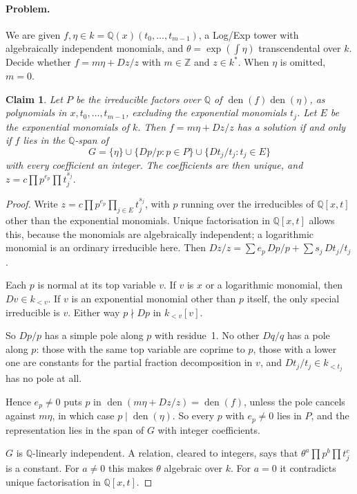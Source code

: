 \documentclass[11pt]{article}
\newtheorem{claim}[theorem]{Claim}
\theoremstyle{definition}
\theoremstyle{remark}
\newcommand{\Q}{\mathbb{Q}}
\newcommand{\Z}{\mathbb{Z}}
\begin{document}
\paragraph{Problem.} We are given $f,\eta\in k=\Q(x)(t_0,\dots,t_{m-1})$, a
Log/Exp tower with algebraically independent monomials, and
$\theta=\exp(\int\eta)$ transcendental over $k$. Decide whether
$f=m\eta+Dz/z$ with $m\in\Z$ and $z\in k^*$. When $\eta$ is omitted, $m=0$.

\begin{claim}
Let $P$ be the irreducible factors over $\Q$ of $\operatorname{den}(f)\operatorname{den}(\eta)$,
as polynomials in $x,t_0,\dots,t_{m-1}$, excluding the exponential monomials
$t_j$. Let $E$ be the exponential monomials of $k$. Then $f=m\eta+Dz/z$ has a
solution if and only if $f$ lies in the $\Q$-span of
\[ G=\{\eta\}\cup\{Dp/p : p\in P\}\cup\{Dt_j/t_j : t_j\in E\} \]
with every coefficient an integer. The coefficients are then unique, and
$z=c\prod p^{e_p}\prod t_j^{s_j}$.
\end{claim}

\begin{proof}
Write $z=c\prod p^{e_p}\prod_{j\in E}t_j^{s_j}$, with $p$ running over the
irreducibles of $\Q[x,t]$ other than the exponential monomials. Unique
factorisation in $\Q[x,t]$ allows this, because the monomials are algebraically
independent; a logarithmic monomial is an ordinary irreducible here. Then
$Dz/z=\sum e_p\,Dp/p+\sum s_j\,Dt_j/t_j$.

Each $p$ is normal at its top variable $v$. If $v$ is $x$ or a logarithmic
monomial, then $Dv\in k_{<v}$. If $v$ is an exponential monomial other than $p$
itself, the only special irreducible is $v$. Either way $p\nmid Dp$ in
$k_{<v}[v]$.

So $Dp/p$ has a simple pole along $p$ with residue~1. No other $Dq/q$ has a
pole along $p$: those with the same top variable are coprime to $p$, those with
a lower one are constants for the partial fraction decomposition in $v$, and
$Dt_j/t_j\in k_{<t_j}$ has no pole at all.

Hence $e_p\neq0$ puts $p$ in $\operatorname{den}(m\eta+Dz/z)=\operatorname{den}(f)$,
unless the pole cancels against $m\eta$, in which case $p\mid\operatorname{den}(\eta)$.
So every $p$ with $e_p\ne0$ lies in $P$, and the representation lies in the
span of $G$ with integer coefficients.

$G$ is $\Q$-linearly independent. A relation, cleared to integers, says that
$\theta^a\prod p^b\prod t_j^c$ is a constant. For $a\neq0$ this makes $\theta$
algebraic over $k$. For $a=0$ it contradicts unique factorisation in $\Q[x,t]$.
\end{proof}
\end{document}
